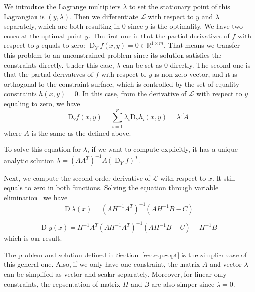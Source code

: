 \par We introduce the Lagrange multipliers $\lambda$ to set the stationary point of this Lagrangian is $(y, \lambda)$. Then we differentiate $\mathcal{L}$ with respect to $y$ and $\lambda$ separately, which are both resulting in 0 since $y$ is the optimality. We have two cases at the optimal point $y$. The first one is that the partial derivatives of $f$ with respect to $y$ equals to zero: $\operatorname{D}_Yf(x,y) = 0 \in \mathbb{R}^{1 \times m}$. That means we transfer this problem to an unconstrained problem since its solution satisfies the constraints directly. Under this case, $\lambda$ can be set as 0 directly. The second one is that the partial derivatives of $f$ with respect to $y$ is non-zero vector, and it is orthogonal to the constraint surface, which is controlled by the set of equality constraints $h(x, y) = 0$. In this case, from the derivative of $\mathcal{L}$ with respect to $y$ equaling to zero, we have
\begin{equation}
    \mathrm{D}_{Y} f(x, y)=\sum_{i=1}^{p} \lambda_{i} \mathrm{D}_{Y} h_{i}(x, y)=\lambda^{T} A
\end{equation}
where $A$ is the same as the defined above. 
\par To solve this equation for $\lambda$, if we want to compute explicitly, it has a unique analytic solution $\lambda = (AA^T)^{-1}A(\operatorname{D}_Yf)^T$. 

\par Next, we compute the second-order derivative of $\mathcal{L}$ with respect to $x$. It still equals to zero in both functions. Solving the equation through variable elimination~\citep{BS:04} we have
\begin{equation}
    \operatorname{D} \lambda(x)=\left(A H^{-1} A^{T}\right)^{-1}\left(A H^{-1} B-C\right)
\end{equation}

\begin{equation}
    \label{equ:solution-eq}
    \operatorname{D} y(x)=H^{-1} A^{T}\left(A H^{-1} A^{T}\right)^{-1}\left(A H^{-1} B-C\right)-H^{-1} B
\end{equation}
which is our result. 
\par The problem and solution defined in Section~\ref{sec:equ-opt} is the simplier case of this general one. Also, if we only have one constraint, the matrix $A$ and vector $\lambda$ can be simplifed as vector and scalar separately. Moreover, for linear only constraints, the repsentation of matrix $H$ and $B$ are also simper since $\lambda = 0$.  

